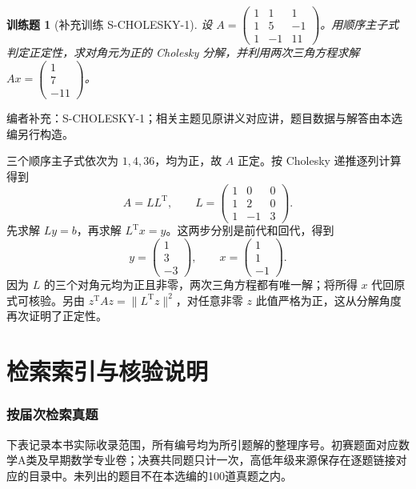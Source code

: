 \documentclass[12pt,fontset=fandol]{ctexart}
\newtheorem{exercise}{训练题}[section]
\begin{document}
\begin{exercise}[补充训练 S-CHOLESKY-1]\label{prob:S-CHOLESKY-1}
设 $A=\begin{pmatrix}1&1&1\\1&5&-1\\1&-1&11\end{pmatrix}$。用顺序主子式判定正定性，求对角元为正的 Cholesky 分解，并利用两次三角方程求解 $Ax=\begin{pmatrix}1\\7\\-11\end{pmatrix}$。
\end{exercise}
\noindent 编者补充：S-CHOLESKY-1；相关主题见原讲义对应讲，题目数据与解答由本选编另行构造。
\begin{solve}
三个顺序主子式依次为 $1,4,36$，均为正，故 $A$ 正定。按 Cholesky 递推逐列计算得到
\[A=LL^{\mathrm T},\qquad L=\begin{pmatrix}1&0&0\\1&2&0\\1&-1&3\end{pmatrix}.\]
先求解 $Ly=b$，再求解 $L^{\mathrm T}x=y$。这两步分别是前代和回代，得到
\[y=\begin{pmatrix}1\\3\\-3\end{pmatrix},\qquad x=\begin{pmatrix}1\\1\\-1\end{pmatrix}.\]
因为 $L$ 的三个对角元均为正且非零，两次三角方程都有唯一解；将所得 $x$ 代回原式可核验。另由 $z^{\mathrm T}Az=\|L^{\mathrm T}z\|^2$，对任意非零 $z$ 此值严格为正，这从分解角度再次证明了正定性。
\end{solve}

\part{检索索引与核验说明}

\section{按届次检索真题}\label{sec:sources}

下表记录本书实际收录范围，所有编号均为所引题解的整理序号。初赛题面对应数学A类及早期数学专业卷；决赛共同题只计一次，高低年级来源保存在逐题链接对应的目录中。未列出的题目不在本选编的100道真题之内。
\end{document}
